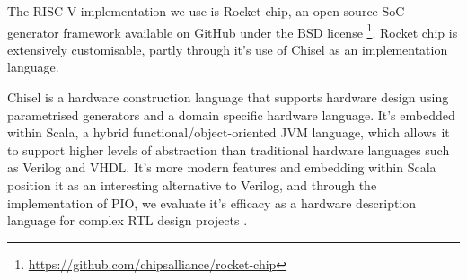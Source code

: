 The RISC-V implementation we use is Rocket chip, an open-source SoC generator framework available on GitHub under the BSD license \footnote{\url{https://github.com/chipsalliance/rocket-chip}}. Rocket chip is extensively customisable, partly through it's use of Chisel as an implementation language.

Chisel is a hardware construction language that supports hardware design using parametrised generators and a domain specific hardware language. It's embedded within Scala, a hybrid functional/object-oriented JVM language, which allows it to support higher levels of abstraction than traditional hardware languages such as Verilog and VHDL. It's more modern features and embedding within Scala position it as an interesting alternative to Verilog, and through the implementation of PIO, we evaluate it's efficacy as a hardware description language for complex RTL design projects \cite{chisel}.
